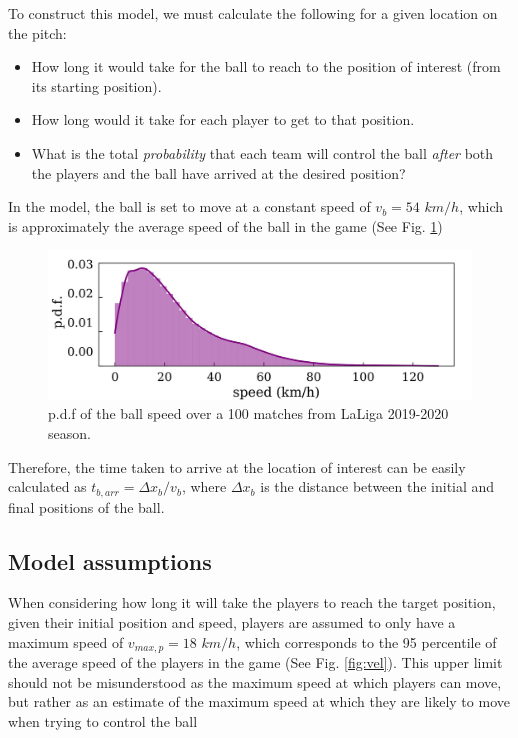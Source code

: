 \documentclass[
  twoside,nohyper]{book}
\providecommand{\tightlist}{%
  \setlength{\itemsep}{0pt}\setlength{\parskip}{0pt}}
\begin{document}
To construct this model, we must calculate the following for a given location on the pitch:

\begin{itemize}
\tightlist
\item
  How long it would take for the ball to reach to the position of interest (from its starting position).
\item
  How long would it take for each player to get to that position.
\item
  What is the total \emph{probability} that each team will control the ball \emph{after} both the players and the ball have arrived at the desired position?
\end{itemize}

In the model, the ball is set to move at a constant speed of \(v_b = 54\) \(km/h\), which is approximately the average speed of the ball in the game (See Fig. \ref{fig:ball})

\begin{figure}[H]

{\centering \includegraphics[width=0.8\linewidth,]{imagenes/ball} 

}

\caption{p.d.f of the ball speed over a 100 matches from LaLiga 2019-2020 season.}\label{fig:ball}
\end{figure}

Therefore, the time taken to arrive at the location of interest can be easily calculated as \(t_{b,arr} = \Delta x_b/v_b\), where \(\Delta x_b\) is the distance between the initial and final positions of the ball.

\subsection{Model assumptions}\label{model-assumptions}

When considering how long it will take the players to reach the target position, given their initial position and speed, players are assumed to only have a maximum speed of \(v_{max,p} = 18\) \(km/h\), which corresponds to the 95 percentile of the average speed of the players in the game (See Fig. \ref{fig:vel}). This upper limit should not be misunderstood as the maximum speed at which players can move, but rather as an estimate of the maximum speed at which they are likely to move when trying to control the ball
\end{document}
